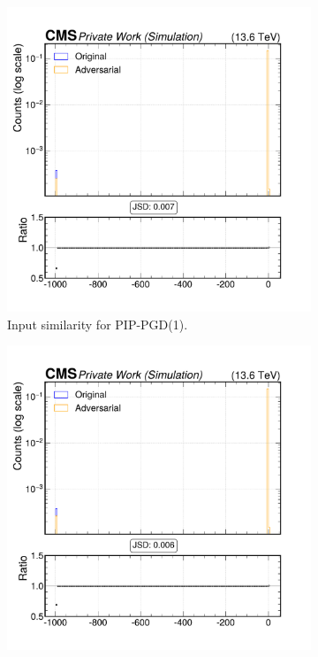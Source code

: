 \begin{figure}[h]
  \centering
  \begin{subfigure}[t]{0.32\textwidth}
    \includegraphics[width=\linewidth]{media/output/features/compare/combined_it_1/cmp_global_features_TagVarCSV_trackSip3dValAboveCharm.pdf}
    \caption*{Input similarity for PIP-PGD(1).}
  \end{subfigure}\hfill
  \begin{subfigure}[t]{0.32\textwidth}
    \includegraphics[width=\linewidth]{media/output/features/compare/combined_it_2/cmp_global_features_TagVarCSV_trackSip3dValAboveCharm.pdf}

\end{subfigure}
\end{figure}
